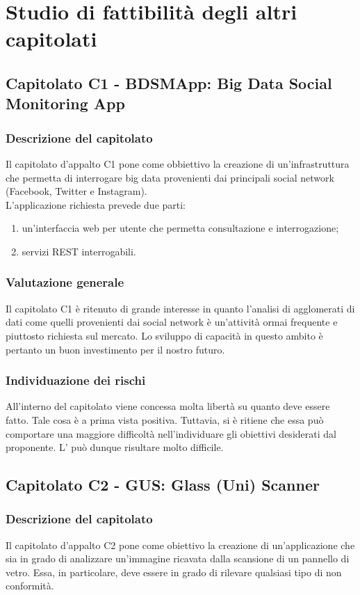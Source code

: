 \section{Studio di fattibilità degli altri capitolati}
	\subsection{Capitolato C1 - BDSMApp: Big Data Social Monitoring App}
		\subsubsection{Descrizione del capitolato}
			Il capitolato d'appalto C1 pone come obbiettivo la creazione di un'infrastruttura che permetta di interrogare big data provenienti dai principali social network (Facebook, Twitter e Instagram).\\
			L'applicazione richiesta prevede due parti:
			\begin{enumerate}
				\item un'interfaccia web per utente che permetta consultazione e interrogazione;
				\item servizi REST interrogabili.
			\end{enumerate}
		\subsubsection{Valutazione generale}
			Il capitolato C1 è ritenuto di grande interesse in quanto l'analisi di agglomerati di dati come quelli provenienti dai social network è un'attività ormai frequente e piuttosto richiesta sul mercato. Lo sviluppo di capacità in questo ambito è pertanto un buon investimento per il nostro futuro.
		\subsubsection{Individuazione dei rischi}
		All'interno del capitolato viene concessa molta libertà su quanto deve essere fatto. Tale cosa è a prima vista positiva. Tuttavia, si è ritiene che essa può comportare una maggiore difficoltà nell'individuare gli obiettivi desiderati dal proponente. L' può dunque risultare molto difficile.
	\subsection{Capitolato C2 - GUS: Glass (Uni) Scanner}
		\subsubsection{Descrizione del capitolato}
			Il capitolato d'appalto C2 pone come obiettivo la creazione di un'applicazione che sia in grado di analizzare un'immagine ricavata dalla scansione di un pannello di vetro. Essa, in particolare, deve essere in grado di rilevare qualsiasi tipo di non conformità.
